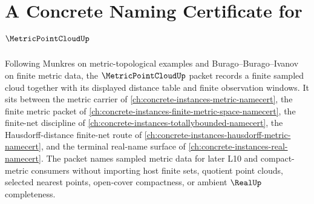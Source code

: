 \chapter{A Concrete Naming Certificate for $\MetricPointCloudUp$}
\label{ch:concrete-instances-metric-point-cloud-namecert}

Following Munkres on metric-topological examples and Burago--Burago--Ivanov on finite metric data, the $\MetricPointCloudUp$ packet records a finite sampled cloud together with its displayed distance table and finite observation windows. It sits between the metric carrier of \autoref{ch:concrete-instances-metric-namecert}, the finite metric packet of \autoref{ch:concrete-instances-finite-metric-space-namecert}, the finite-net discipline of \autoref{ch:concrete-instances-totallybounded-namecert}, the Hausdorff-distance finite-net route of \autoref{ch:concrete-instances-hausdorff-metric-namecert}, and the terminal real-name surface of \autoref{ch:concrete-instances-real-namecert}. The packet names sampled metric data for later L10 and compact-metric consumers without importing host finite sets, quotient point clouds, selected nearest points, open-cover compactness, or ambient $\RealUp$ completeness.

